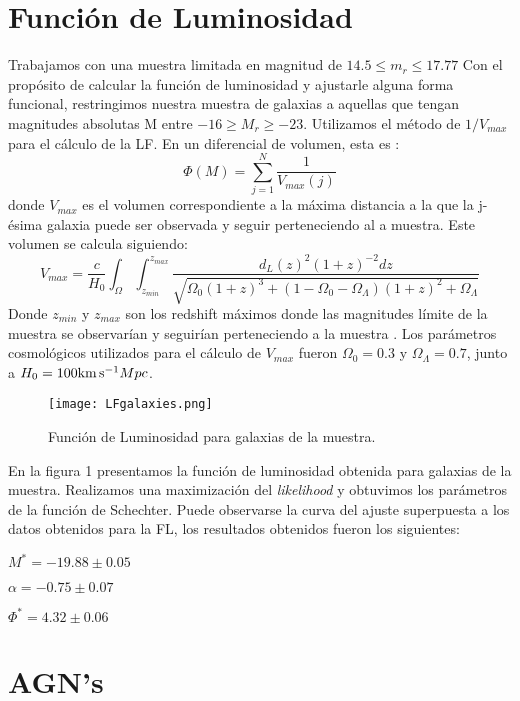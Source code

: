 \documentclass[a4paper,10pt]{article}
\newcommand{\kms}{{\rm km\,s^{-1}}}
\begin{document}
\section{Funci\'on de Luminosidad}
Trabajamos con una muestra limitada en magnitud de $14.5 \leq m_{r} \leq17.77$
Con el prop\'osito de calcular la funci\'on de luminosidad y ajustarle alguna forma funcional, restringimos nuestra muestra de galaxias a aquellas que tengan magnitudes absolutas M entre $-16 \geq M_{r} \geq -23 $. Utilizamos el m\'etodo de $1/V_{max}$ para el c\'alculo de la LF. En un diferencial de volumen, esta es :
\begin{equation}
 \Phi(M)=\sum_{j=1}^{N}\frac{1}{V_{max}(j)}
\end{equation}
donde $V_{max}$ es el volumen correspondiente a la m\'axima distancia a la que la j-\'esima galaxia puede ser observada y seguir perteneciendo al a muestra. Este volumen se calcula siguiendo: 
\begin{equation}
 V_{max}=\frac{c}{H_{0}} \int_{\Omega}\int_{z_{min}}^{z_{max}}\frac{d_{L}(z)^{2}(1+z)^{-2}dz}{\sqrt{\Omega_{0}(1+z)^{3}+(1-\Omega_{0}-\Omega_{\Lambda})(1+z)^{2}+\Omega_{\Lambda}}} 
\end{equation}
Donde $z_{min}$ y $z_{max}$ son los redshift m\'aximos donde las magnitudes l\'imite de la muestra se observar\'ian y seguir\'ian perteneciendo a la muestra
\citep{Willmer1997}. Los par\'ametros cosmol\'ogicos utilizados para el c\'alculo de $V_{max}$ fueron $\Omega_{0}=0.3$ y $\Omega_{\Lambda}=0.7$, junto a $H_{0}=100\kms Mpc$.
\begin{figure}[h]
 \centering
 \texttt{[image: LFgalaxies.png]}
 \caption{Funci\'on de Luminosidad para galaxias de la muestra.}
 \label{fig:1}
\end{figure}

En la figura 1 presentamos la funci\'on de luminosidad obtenida para galaxias de la muestra. Realizamos una maximizaci\'on del \textit{likelihood} y obtuvimos los par\'ametros de la funci\'on de Schechter. Puede observarse la curva del ajuste superpuesta a los datos obtenidos para la FL, los resultados obtenidos fueron los siguientes:


$ M^{\ast}=-19.88\pm0.05 $

$\alpha=-0.75\pm0.07 $

$\Phi^{\ast}=4.32\pm0.06 $


\section{AGN's}
\end{document}
